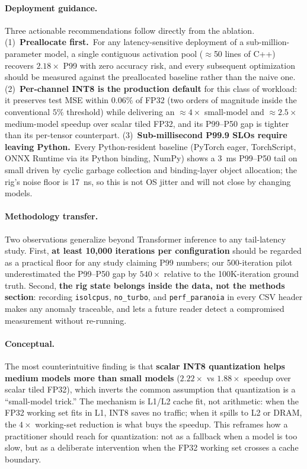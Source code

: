 \documentclass{article}
\begin{document}
\paragraph{Deployment guidance.}
Three actionable recommendations follow directly from the ablation.
(1)~\textbf{Preallocate first.}~For any latency-sensitive deployment of a sub-million-parameter model, a single contiguous activation pool ($\approx$50 lines of C++) recovers $2.18\times$ P99 with zero accuracy risk, and every subsequent optimization should be measured against the preallocated baseline rather than the naive one.
(2)~\textbf{Per-channel INT8 is the production default} for this class of workload: it preserves test MSE within $0.06\%$ of FP32 (two orders of magnitude inside the conventional $5\%$ threshold) while delivering an $\approx$$4\times$ small-model and $\approx$$2.5\times$ medium-model speedup over scalar tiled FP32, and its P99--P50 gap is tighter than its per-tensor counterpart.
(3)~\textbf{Sub-millisecond P99.9 SLOs require leaving Python.}~Every Python-resident baseline (PyTorch eager, TorchScript, ONNX Runtime via its Python binding, NumPy) shows a 3~ms P99--P50 tail on small driven by cyclic garbage collection and binding-layer object allocation; the rig's noise floor is 17~ns, so this is not OS jitter and will not close by changing models.

\paragraph{Methodology transfer.}
Two observations generalize beyond Transformer inference to any tail-latency study.
First, \textbf{at least 10{,}000 iterations per configuration} should be regarded as a practical floor for any study claiming P99 numbers; our 500-iteration pilot underestimated the P99--P50 gap by $540\times$ relative to the 100K-iteration ground truth.
Second, \textbf{the rig state belongs inside the data, not the methods section}: recording \texttt{isolcpus}, \texttt{no\_turbo}, and \texttt{perf\_paranoia} in every CSV header makes any anomaly traceable, and lets a future reader detect a compromised measurement without re-running.

\paragraph{Conceptual.}
The most counterintuitive finding is that \textbf{scalar INT8 quantization helps medium models more than small models} ($2.22\times$ vs $1.88\times$ speedup over scalar tiled FP32), which inverts the common assumption that quantization is a ``small-model trick.''
The mechanism is L1/L2 cache fit, not arithmetic: when the FP32 working set fits in L1, INT8 saves no traffic; when it spills to L2 or DRAM, the $4\times$ working-set reduction is what buys the speedup.
This reframes how a practitioner should reach for quantization: not as a fallback when a model is too slow, but as a deliberate intervention when the FP32 working set crosses a cache boundary.
\end{document}
